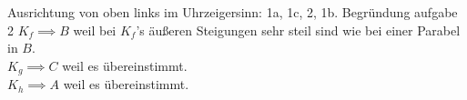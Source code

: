\documentclass{report}
\begin{document}




Ausrichtung von oben links im Uhrzeigersinn: 1a, 1c, 2, 1b.
Begründung aufgabe 2
$K_f\implies B$ weil bei $K_f$'s äußeren Steigungen sehr steil sind wie bei
einer Parabel in $B$.\\
$K_g\implies C$ weil es übereinstimmt.\\
$K_h\implies A$ weil es übereinstimmt.\\

\end{document}
